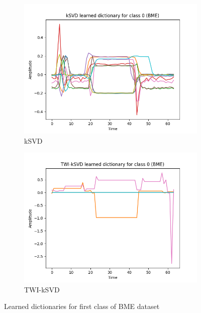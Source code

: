 \documentclass[11pt]{article}
\begin{document}
\begin{figure}[!ht]
    \centering
    \begin{subfigure}[b]{0.49\textwidth}
      \includegraphics[width=\textwidth]{../../figures/kSVD_dictionary_BME_class_0.png}
      \caption*{kSVD}
    \end{subfigure}
    \begin{subfigure}[b]{0.49\textwidth}
        \includegraphics[width=\textwidth]{../../figures/TWI_kSVD_dictionary_BME_class_0.png}
        \caption*{TWI-kSVD}
      \end{subfigure}
    \caption{Learned dictionaries for first class of BME dataset}\label{fig:learn_dicts_BME}
\end{figure}
\end{document}
